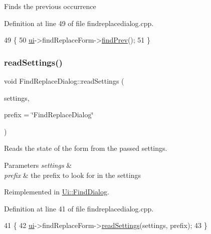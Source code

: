Finds the previous occurrence 

Definition at line 49 of file findreplacedialog.\+cpp.


\begin{DoxyCode}
49                                  \{
50     \hyperlink{class_ui_1_1_find_replace_dialog_a29b7e2e415bc683d3dd089b366cccf4a}{ui}->findReplaceForm->\hyperlink{class_ui_1_1_find_replace_dialog_af48970c4a221387bc4df6b7f521af693}{findPrev}();
51 \}
\end{DoxyCode}
\mbox{\label{class_ui_1_1_find_replace_dialog_a2be8b8724a5f9a7e6dff30348f94761c}} 
\subsubsection{\texorpdfstring{read\+Settings()}{readSettings()}}
{\footnotesize\ttfamily void Find\+Replace\+Dialog\+::read\+Settings (\begin{DoxyParamCaption}\item[{Q\+Settings \&}]{settings,  }\item[{const Q\+String \&}]{prefix = {\ttfamily \char`\"{}FindReplaceDialog\char`\"{}} }\end{DoxyParamCaption})\hspace{0.3cm}{\ttfamily [virtual]}}

Reads the state of the form from the passed settings. 
\begin{DoxyParams}{Parameters}
{\em settings} & \\
\hline
{\em prefix} & the prefix to look for in the settings \\
\hline
\end{DoxyParams}


Reimplemented in \hyperlink{class_ui_1_1_find_dialog_adcb3b60f3a1a4a41f7edddf7b203ba44}{Ui\+::\+Find\+Dialog}.



Definition at line 41 of file findreplacedialog.\+cpp.


\begin{DoxyCode}
41                                                                                \{
42     \hyperlink{class_ui_1_1_find_replace_dialog_a29b7e2e415bc683d3dd089b366cccf4a}{ui}->findReplaceForm->\hyperlink{class_ui_1_1_find_replace_dialog_a2be8b8724a5f9a7e6dff30348f94761c}{readSettings}(settings, prefix);
43 \}
\end{DoxyCode}
\mbox{\label{class_ui_1_1_find_replace_dialog_a3d3cd91477be5d6529e9aa3de21958a6}} 
